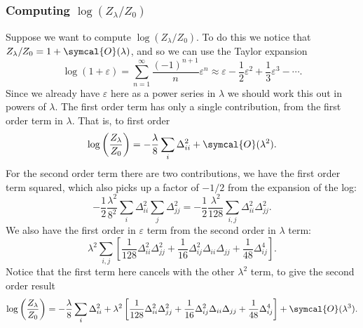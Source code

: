 \documentclass[fleqn]{NotesClass}
\newcommand{\order}{\symcal{O}}
\begin{document}
    \subsubsection{Computing \texorpdfstring{\(\log(Z_\lambda/Z_0)\)}{log(Zlambda/Z0)}}
    Suppose we want to compute \(\log(Z_\lambda/Z_0)\).
    To do this we notice that \(Z_\lambda/Z_0 = 1 + \order(\lambda)\), and so we can use the Taylor expansion
    \begin{equation}
        \log(1 + \varepsilon) = \sum_{n = 1}^{\infty} \frac{(-1)^{n + 1}}{n}\varepsilon^n \approx \varepsilon - \frac{1}{2}\varepsilon^2 + \frac{1}{3}\varepsilon^3 - \dotsb.
    \end{equation}
    Since we already have \(\varepsilon\) here as a power series in \(\lambda\) we should work this out in powers of \(\lambda\).
    The first order term has only a single contribution, from the first order term in \(\lambda\).
    That is, to first order
    \begin{equation}
        \log\left( \frac{Z_\lambda}{Z_0} \right) = -\frac{\lambda}{8}\sum_i \Delta_{ii}^2 + \order(\lambda^2).
    \end{equation}
    For the second order term there are two contributions, we have the first order term squared, which also picks up a factor of \(-1/2\) from the expansion of the log:
    \begin{equation}
        -\frac{1}{2} \frac{\lambda^2}{8^2} \sum_{i} \Delta_{ii}^2 \sum_j \Delta_{jj}^2 = -\frac{1}{2} \frac{\lambda^2}{128} \sum_{i, j} \Delta_{ii}^2\Delta_{jj}^2.
    \end{equation}
    We also have the first order in \(\varepsilon\) term from the second order in \(\lambda\) term:
    \begin{equation}
        \lambda^2 \sum_{i,j} \left[ \frac{1}{128}\Delta_{ii}^2\Delta_{jj}^2 + \frac{1}{16} \Delta_{ij}^2\Delta_{ii}\Delta_{jj} + \frac{1}{48}\Delta_{ij}^4 \right].
    \end{equation}
    Notice that the first term here cancels with the other \(\lambda^2\) term, to give the second order result
    \begin{equation}
        \log\left( \frac{Z_\lambda}{Z_0} \right) = -\frac{\lambda}{8} \sum_{i} \Delta_{ii}^2 + \lambda^2 \left[ \frac{1}{128}\Delta_{ii}^2\Delta_{jj}^2 + \frac{1}{16}\Delta_{ij}^2 \Delta_{ii} \Delta_{jj} + \frac{1}{48}\Delta_{ij}^4 \right] + \order(\lambda^3).
    \end{equation}
    
\end{document}
